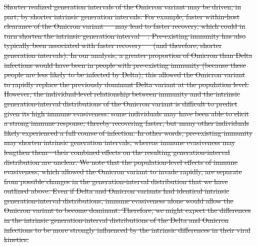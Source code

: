\documentclass[12pt]{article}
\providecommand{\DIFdeltex}[1]{{\protect\color{red}\sout{#1}}}                      %
\providecommand{\DIFdel}[1]{\texorpdfstring{\DIFdeltex{#1}}{}} %
\begin{document}
\DIFdel{Shorter realized generation intervals of the Omicron variant may be driven, in part, by shorter intrinsic generation intervals.
For example, faster within-host clearance of the Omicron variant \mbox{%
\citep{hay2022viral} }\hspace{0pt}%
may lead to faster recovery, which could in turn shorten the intrinsic generation interval \mbox{%
\citep{roberts2007model}}\hspace{0pt}%
.
Pre-existing immunity has also typically been associated with faster recovery \mbox{%
\citep{kissler2021viral} }\hspace{0pt}%
(and therefore, shorter generation intervals).
In our analysis, a greater proportion of Omicron than Delta infections would have been in people with pre-existing immunity (because these people are less likely to be infected by Delta);
this allowed the Omicron variant to rapidly replace the previously dominant Delta variant at the population level.
However, the individual-level relationship between immunity and the intrinsic generation-interval distributions of the Omicron variant is difficult to predict given its high immune evasiveness:
some individuals may have been able to elicit a strong immune response, thereby recovering faster, but many other individuals likely experienced a full course of infection.
In other words, pre-existing immunity may shorten intrinsic generation intervals, whereas immune evasiveness may lengthen them---their combined effects on the resulting generation-interval distribution are unclear.
We note that the population-level effects of immune evasiveness, which allowed the Omicron variant to invade rapidly, are separate from possible changes in the generation-interval distribution that we have outlined above.
Even if Delta and Omicron variants had identical intrinsic generation-interval distributions, immune evasiveness alone would allow the Omicron variant to become dominant.
Therefore, we might expect the differences in the intrinsic generation-interval distributions of the Delta and Omicron infections to be more strongly influenced by the intrinsic differences in their viral kinetics.
}%
\end{document}
